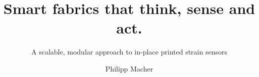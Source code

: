 \documentclass[
	ngerman,
	ruledheaders=section,%
	class=report,%
	thesis={type=bachelor},%
	accentcolor=9c,%
	custommargins=true,%
	marginpar=false,%
	parskip=half-,%
	fontsize=11pt,%
]{tudapub}
\begin{document}

\title{Smart fabrics that think, sense and act.}
\subtitle{A scalable, modular approach to in-place printed strain sensors}
\author[P. Macher]{Philipp Macher}%


\submissiondate{\today}
\examdate{\today}



\maketitle

%
\end{document}
